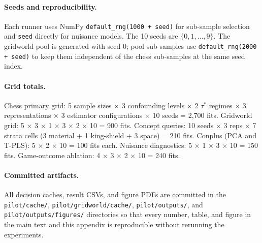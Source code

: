 \documentclass{article}
\begin{document}
\paragraph{Seeds and reproducibility.} Each runner uses NumPy
\texttt{default\_rng(1000 + seed)} for sub-sample selection and
\texttt{seed} directly for nuisance models. The 10 seeds are
$\{0, 1, \ldots, 9\}$. The gridworld pool is generated with seed 0; pool
sub-samples use \texttt{default\_rng(2000 + seed)} to keep them independent
of the chess sub-samples at the same seed index.

\paragraph{Grid totals.} Chess primary grid: 5 sample sizes $\times$ 3
confounding levels $\times$ 2 $\tau^*$ regimes $\times$ 3 representations
$\times$ 3 estimator configurations $\times$ 10 seeds = 2,700 fits.
Gridworld grid: 5 $\times$ 3 $\times$ 1 $\times$ 3 $\times$ 2 $\times$ 10 =
900 fits. Concept queries: 10 seeds $\times$ 3 reps $\times$ 7 strata cells
(3 material + 1 king-shield + 3 space) = 210 fits. Conplus (PCA and T-PLS):
5 $\times$ 2 $\times$ 10 = 100 fits each. Nuisance diagnostics: 5 $\times$
1 $\times$ 3 $\times$ 10 = 150 fits. Game-outcome ablation: 4 $\times$ 3
$\times$ 2 $\times$ 10 = 240 fits.

\paragraph{Committed artifacts.} All decision caches, result CSVs, and
figure PDFs are committed in the \texttt{pilot/cache/},
\texttt{pilot/gridworld/cache/}, \texttt{pilot/outputs/}, and
\texttt{pilot/outputs/figures/} directories so that every number, table, and
figure in the main text and this appendix is reproducible without rerunning
the experiments.

\newpage

\end{document}
